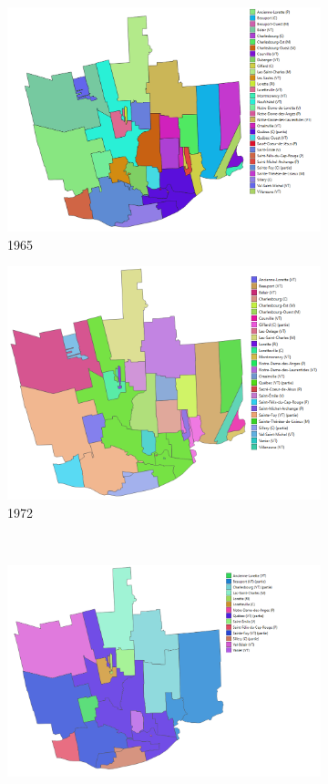 \begin{figure}[ht]
  \centering
  \begin{subfigure}[t]{0.45\textwidth}
    \centering
    \includegraphics[width=0.9\linewidth]{images/municipalites_1965.png}
    \caption{1965}
    \label{fig:municipalites_1965}
  \end{subfigure}%
  \begin{subfigure}[t]{0.45\textwidth}
    \centering
    \includegraphics[width=0.9\linewidth]{images/municipalites_1972.png}
    \caption{1972}
    \label{fig:municipalites_1972}
  \end{subfigure}\\
  \begin{subfigure}[t]{0.45\textwidth}
    \centering
    \includegraphics[width=0.9\linewidth]{images/municipalites_1980.png}

\end{subfigure}
\end{figure}
